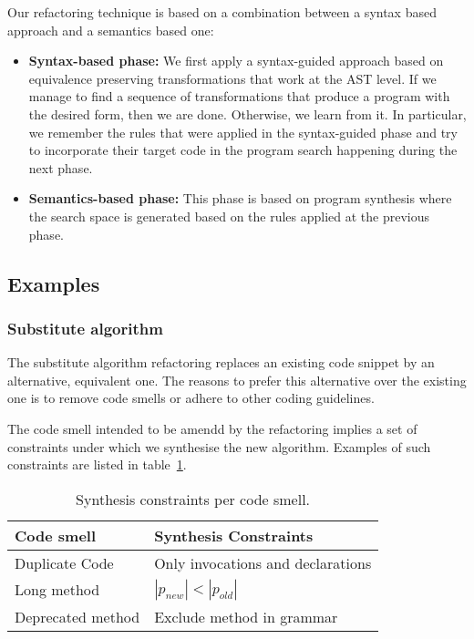 \documentclass[runningheads,a4paper]{llncs}
\begin{document}
Our refactoring technique is based on a combination between a syntax based
approach and a semantics based one:
\begin{itemize}
\item {\bf Syntax-based phase:} We first apply a syntax-guided
  approach based on equivalence preserving transformations that work
  at the AST level.  If we manage to find a sequence of
  transformations that produce a program with the desired form, then
  we are done.  Otherwise, we learn from it. In particular, we
  remember the rules that were applied in the syntax-guided phase and
  try to incorporate their target code in the program search happening
  during the next phase.
\item {\bf Semantics-based phase:} This phase is based on program
  synthesis where the search space is generated based on the
  rules applied at the previous phase.  
\end{itemize}  



\subsection{Examples}

\subsubsection{Substitute algorithm}

The substitute algorithm refactoring replaces an existing code snippet by an
alternative, equivalent one. The reasons to prefer this alternative over the
existing one is to remove code smells or adhere to other coding guidelines.

The code smell intended to be amendd by the refactoring implies a set of
constraints under which we synthesise the new algorithm. Examples of such
constraints are listed in table~\ref{constraints-per-code-smell}.

\begin{table}[]
\begin{tabular}{|l|l|}
Code smell        & Synthesis Constraints             \\\hline 
Duplicate Code    & Only invocations and declarations \\
Long method       & $|p_{new}|<|p_{old}|$             \\
Deprecated method & Exclude method in grammar         \\
\end{tabular}
\caption{Synthesis constraints per code smell.}
\label{constraints-per-code-smell}
\end{table}
\end{document}
